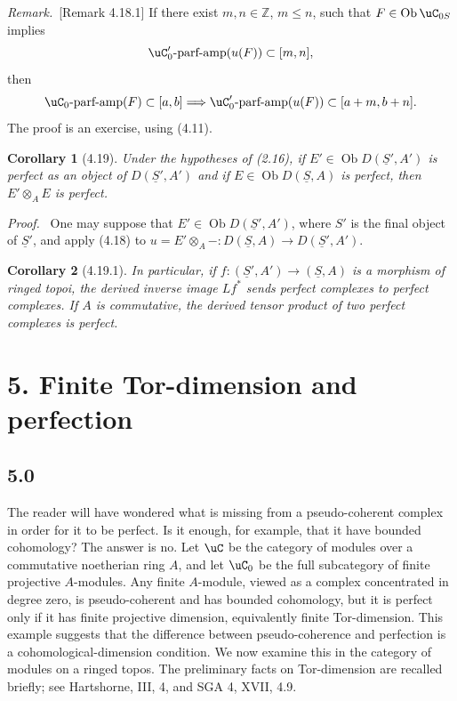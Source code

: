 \documentclass[11pt]{article}
\theoremstyle{plain}
\newtheorem*{corollary*}{Corollary}
\theoremstyle{definition}
\theoremstyle{remark}
\newenvironment{prooftext}{\par\noindent\textit{Proof.}\ }{\par\medskip}
\newenvironment{remarktext}{\par\medskip\noindent\textit{Remark.}\ }{\par\medskip}
\newcommand{\ZZ}{\mathbb Z}
\DeclareMathOperator{\ob}{Ob}
\providecommand{\uS}{\underline{S}}
\begin{document}
\begin{remarktext}[Remark 4.18.1]
If there exist $m,n\in\ZZ$, $m\leq n$, such that $F\in\ob\uC_{0S}$ implies
\[
\uC'_0\text{-parf-amp}(u(F))\subset[m,n],
\]
then
\[
\uC_0\text{-parf-amp}(F)\subset[a,b]
\Longrightarrow
\uC'_0\text{-parf-amp}(u(F))\subset[a+m,b+n].
\]
The proof is an exercise, using (4.11).
\end{remarktext}

\begin{corollary*}[4.19]
Under the hypotheses of (2.16), if $E'\in\ob D(\uS',A')$ is perfect as an object of $D(\uS',A')$ and if $E\in\ob D(\uS,A)$ is perfect, then $E'\otimes_AE$ is perfect.
\end{corollary*}

\begin{prooftext}
One may suppose that $E'\in\ob D(\uS',A')$, where $S'$ is the final object of $\uS'$, and apply (4.18) to $u=E'\otimes_A-:D(\uS,A)\to D(\uS',A')$.
\end{prooftext}

\begin{corollary*}[4.19.1]
In particular, if $f:(\uS',A')\to(\uS,A)$ is a morphism of ringed topoi, the derived inverse image $Lf^*$ sends perfect complexes to perfect complexes. If $A$ is commutative, the derived tensor product of two perfect complexes is perfect.
\end{corollary*}

\section*{5. Finite Tor-dimension and perfection}

\subsection*{5.0}
The reader will have wondered what is missing from a pseudo-coherent complex in order for it to be perfect. Is it enough, for example, that it have bounded cohomology? The answer is no. Let $\uC$ be the category of modules over a commutative noetherian ring $A$, and let $\uC_0$ be the full subcategory of finite projective $A$-modules. Any finite $A$-module, viewed as a complex concentrated in degree zero, is pseudo-coherent and has bounded cohomology, but it is perfect only if it has finite projective dimension, equivalently finite Tor-dimension. This example suggests that the difference between pseudo-coherence and perfection is a cohomological-dimension condition. We now examine this in the category of modules on a ringed topos. The preliminary facts on Tor-dimension are recalled briefly; see Hartshorne, III, 4, and SGA 4, XVII, 4.9.
\end{document}
